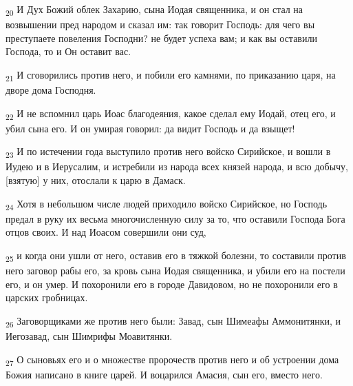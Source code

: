 \begin{tcolorbox}
\textsubscript{20} И Дух Божий облек Захарию, сына Иодая священника, и он стал на возвышении пред народом и сказал им: так говорит Господь: для чего вы преступаете повеления Господни? не будет успеха вам; и как вы оставили Господа, то и Он оставит вас.
\end{tcolorbox}
\begin{tcolorbox}
\textsubscript{21} И сговорились против него, и побили его камнями, по приказанию царя, на дворе дома Господня.
\end{tcolorbox}
\begin{tcolorbox}
\textsubscript{22} И не вспомнил царь Иоас благодеяния, какое сделал ему Иодай, отец его, и убил сына его. И он умирая говорил: да видит Господь и да взыщет!
\end{tcolorbox}
\begin{tcolorbox}
\textsubscript{23} И по истечении года выступило против него войско Сирийское, и вошли в Иудею и в Иерусалим, и истребили из народа всех князей народа, и всю добычу, [взятую] у них, отослали к царю в Дамаск.
\end{tcolorbox}
\begin{tcolorbox}
\textsubscript{24} Хотя в небольшом числе людей приходило войско Сирийское, но Господь предал в руку их весьма многочисленную силу за то, что оставили Господа Бога отцов своих. И над Иоасом совершили они суд,
\end{tcolorbox}
\begin{tcolorbox}
\textsubscript{25} и когда они ушли от него, оставив его в тяжкой болезни, то составили против него заговор рабы его, за кровь сына Иодая священника, и убили его на постели его, и он умер. И похоронили его в городе Давидовом, но не похоронили его в царских гробницах.
\end{tcolorbox}
\begin{tcolorbox}
\textsubscript{26} Заговорщиками же против него были: Завад, сын Шимеафы Аммонитянки, и Иегозавад, сын Шимрифы Моавитянки.
\end{tcolorbox}
\begin{tcolorbox}
\textsubscript{27} О сыновьях его и о множестве пророчеств против него и об устроении дома Божия написано в книге царей. И воцарился Амасия, сын его, вместо него.
\end{tcolorbox}

